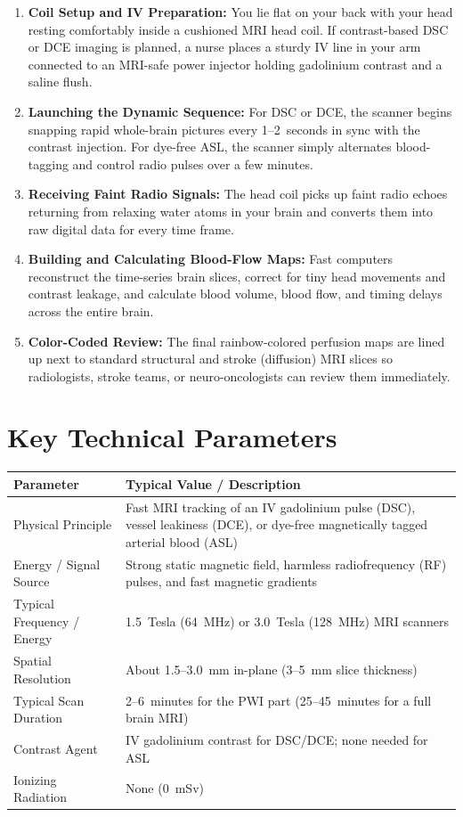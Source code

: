 \begin{enumerate}
    \item \textbf{Coil Setup and IV Preparation:} You lie flat on your back with your head resting comfortably inside a cushioned MRI head coil. If contrast-based DSC or DCE imaging is planned, a nurse places a sturdy IV line in your arm connected to an MRI-safe power injector holding gadolinium contrast and a saline flush.
    \item \textbf{Launching the Dynamic Sequence:} For DSC or DCE, the scanner begins snapping rapid whole-brain pictures every 1--2~seconds in sync with the contrast injection. For dye-free ASL, the scanner simply alternates blood-tagging and control radio pulses over a few minutes.
    \item \textbf{Receiving Faint Radio Signals:} The head coil picks up faint radio echoes returning from relaxing water atoms in your brain and converts them into raw digital data for every time frame.
    \item \textbf{Building and Calculating Blood-Flow Maps:} Fast computers reconstruct the time-series brain slices, correct for tiny head movements and contrast leakage, and calculate blood volume, blood flow, and timing delays across the entire brain.
    \item \textbf{Color-Coded Review:} The final rainbow-colored perfusion maps are lined up next to standard structural and stroke (diffusion) MRI slices so radiologists, stroke teams, or neuro-oncologists can review them immediately.
\end{enumerate}

\section{Key Technical Parameters}

\noindent
\begin{tabularx}{\textwidth}{@{}l X@{}}
\toprule
\textbf{Parameter} & \textbf{Typical Value / Description} \\
\midrule
Physical Principle & Fast MRI tracking of an IV gadolinium pulse (DSC), vessel leakiness (DCE), or dye-free magnetically tagged arterial blood (ASL) \\
Energy / Signal Source & Strong static magnetic field, harmless radiofrequency (RF) pulses, and fast magnetic gradients \\
Typical Frequency / Energy & 1.5~Tesla (64~MHz) or 3.0~Tesla (128~MHz) MRI scanners \\
Spatial Resolution & About 1.5--3.0~mm in-plane (3--5~mm slice thickness) \\
Typical Scan Duration & 2--6~minutes for the PWI part (25--45~minutes for a full brain MRI) \\
Contrast Agent & IV gadolinium contrast for DSC/DCE; none needed for ASL \\
Ionizing Radiation & None (0~mSv) \\
\bottomrule
\end{tabularx}

